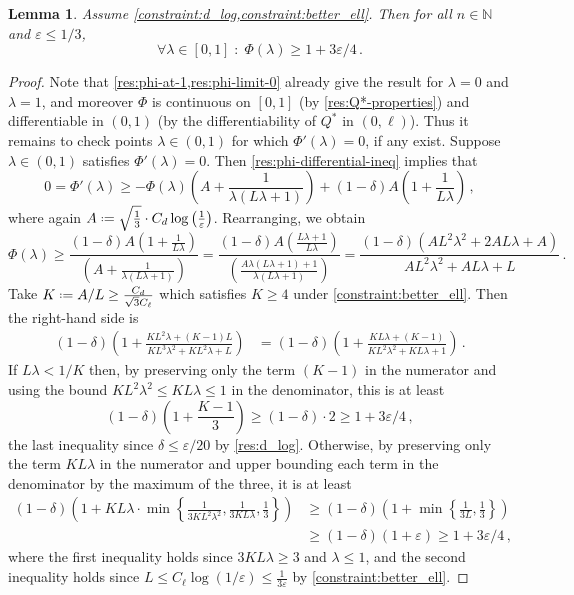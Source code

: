 \documentclass[10pt,a4paper]{article}
\newtheorem{lemma}{Lemma}[section]
\newcommand*{\define}{\mathrel{\vcenter{\baselineskip0.5ex \lineskiplimit0pt
                      \hbox{\scriptsize.}\hbox{\scriptsize.}}}%
                      =}
\newcommand{\bN}{\ensuremath{\mathbb{N}}}
\renewcommand{\epsilon}{\varepsilon}
\begin{document}
\begin{lemma}
    \label{res:phi_bound}
Assume \cref{constraint:d_log,constraint:better_ell}. Then for all $n \in \bN$ and $\epsilon \leq
1/3$,
\[
  \forall \lambda \in [0,1] \;:\; \Phi(\lambda) \ge 1 + 3\epsilon/4 \,.
\]
\end{lemma}
\begin{proof}
    Note that \cref{res:phi-at-1,res:phi-limit-0} already give the result for $\lambda = 0$ and
    $\lambda = 1$, and moreover $\Phi$ is continuous on $[0,1]$ (by
    \cref{res:Q*-properties}) and differentiable in $(0,1)$ (by the differentiability of $Q^*$ in
    $(0, \ell)$).
    Thus it remains
    to check points $\lambda \in (0,1)$ for which $\Phi'(\lambda) = 0$, if any exist. Suppose
    $\lambda \in (0,1)$ satisfies $\Phi'(\lambda) = 0$. Then \cref{res:phi-differential-ineq}
    implies that
    \[
        0 = \Phi'(\lambda)
        \ge -\Phi(\lambda)
            \left( A + \frac{1}{\lambda (L\lambda + 1)} \right)
            + (1-\delta)A \left( 1 + \frac{1}{L\lambda} \right) \,,
    \]
    where again $A \define \sqrt{\frac{1}{3}} \cdot C_d \log\left(\frac{1}{\epsilon}\right)$.
    Rearranging, we obtain
    \[
        \Phi(\lambda)
        \ge \frac{(1-\delta)A \left( 1 + \frac{1}{L\lambda} \right)}
                 {\left( A + \frac{1}{\lambda (L\lambda + 1)} \right)}
        = \frac{(1-\delta)A \left( \frac{L\lambda + 1}{L\lambda} \right)}
                 {\left(\frac{A \lambda (L\lambda + 1) + 1}{\lambda (L\lambda + 1)} \right)}
        = \frac{(1-\delta) (AL^2\lambda^2 + 2AL\lambda + A)}
                 {AL^2\lambda^2 + AL\lambda + L} \,.
    \]
    Take $K \define A/L \geq \tfrac{C_d}{\sqrt{3}C_\ell}$ which satisfies $K \geq 4$ 
under \cref{constraint:better_ell}. Then the right-hand side is
\begin{align*}
  (1-\delta)\left(1 + \frac{KL^2\lambda + (K-1)L}{KL^3\lambda^2 + KL^2\lambda + L}\right)
  &= (1-\delta)\left(1 + \frac{KL\lambda + (K-1)}{KL^2\lambda^2 + KL\lambda + 1}\right) \,.
\end{align*}
If $L\lambda < 1/K$ then, by preserving only the term $(K-1)$ in the numerator and using the
bound $K L^2 \lambda^2 \le KL\lambda \le 1$ in the denominator, this is at least
\[
  (1-\delta)\left(1 + \frac{K-1}{3}\right) \geq (1-\delta) \cdot 2 \ge 1 + 3\epsilon/4 \,,
\]
the last inequality since $\delta \le \epsilon/20$ by \cref{res:d_log}. Otherwise, by preserving
only the term $KL\lambda$ in the numerator and upper bounding each term in the denominator by the
maximum of the three, it is at least
\begin{align*}
  (1-\delta)\left(1 + KL\lambda \cdot
    \min\left\{ \frac{1}{3KL^2\lambda^2}, \frac{1}{3KL\lambda}, \frac{1}{3} \right\} \right)
&\geq 
  (1-\delta)\left(1 + \min\left\{ \frac{1}{3L}, \frac{1}{3} \right\} \right) \\
&\ge (1-\delta)(1+\epsilon)
\ge 1 + 3\epsilon/4 \,,
\end{align*}
where the first inequality holds since $3KL\lambda \ge 3$ and $\lambda \le 1$, and the
second inequality holds since $L \leq C_\ell \log(1/\epsilon) \leq
\frac{1}{3\epsilon}$ by \cref{constraint:better_ell}.
\end{proof}
\end{document}
